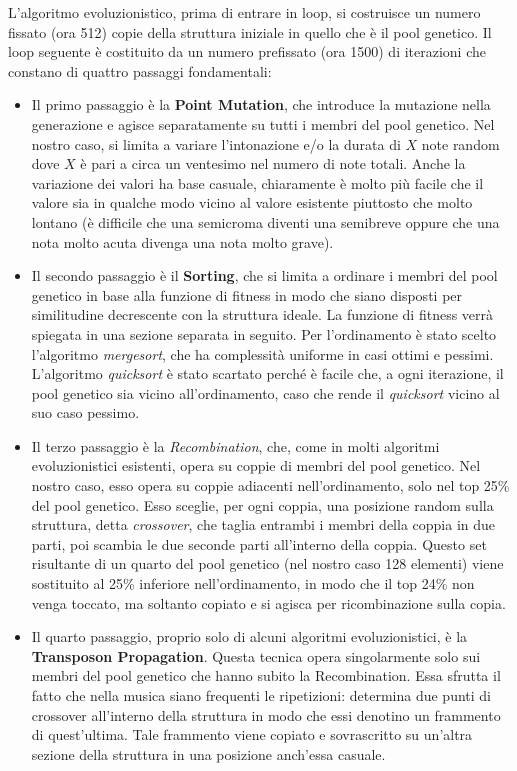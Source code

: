 L'algoritmo evoluzionistico, prima di entrare in loop, si costruisce un numero fissato (ora 512) copie della struttura iniziale in quello che è il pool genetico.
Il loop seguente è costituito da un numero prefissato (ora 1500) di iterazioni che constano di quattro passaggi fondamentali\cite{yt:evol}:
\begin{itemize}
 \item Il primo passaggio è la \textbf{Point Mutation}, che introduce la mutazione nella generazione e agisce separatamente su tutti i membri del pool genetico.
 Nel nostro caso, si limita a variare l'intonazione e/o la durata di $X$ note random dove $X$ è pari a circa un ventesimo nel numero di note totali.
 Anche la variazione dei valori ha base casuale, chiaramente è molto più facile che il valore sia in qualche modo vicino al valore esistente piuttosto che molto lontano (è difficile che una semicroma diventi una semibreve oppure che una nota molto acuta divenga una nota molto grave).
 \item Il secondo passaggio è il \textbf{Sorting}, che si limita a ordinare i membri del pool genetico in base alla funzione di fitness in modo che siano disposti per similitudine decrescente con la struttura ideale.
 La funzione di fitness verrà spiegata in una sezione separata in seguito.
 Per l'ordinamento è stato scelto l'algoritmo \emph{mergesort}, che ha complessità uniforme in casi ottimi e pessimi.
 L'algoritmo \emph{quicksort} è stato scartato perché è facile che, a ogni iterazione, il pool genetico sia vicino all'ordinamento, caso che rende il \emph{quicksort} vicino al suo caso pessimo.
 \item Il terzo passaggio è la \textit{Recombination}, che, come in molti algoritmi evoluzionistici esistenti, opera su coppie di membri del pool genetico.
 Nel nostro caso, esso opera su coppie adiacenti nell'ordinamento, solo nel top 25\% del pool genetico.
 Esso sceglie, per ogni coppia, una posizione random sulla struttura, detta \emph{crossover}, che taglia entrambi i membri della coppia in due parti, poi scambia le due seconde parti all'interno della coppia.
 Questo set risultante di un quarto del pool genetico (nel nostro caso 128 elementi) viene sostituito al 25\% inferiore nell'ordinamento, in modo che il top 24\% non venga toccato, ma soltanto copiato e si agisca per ricombinazione sulla copia.
 \item Il quarto passaggio, proprio solo di alcuni algoritmi evoluzionistici, è la \textbf{Transposon Propagation}.
 Questa tecnica opera singolarmente solo sui membri del pool genetico che hanno subito la Recombination.
 Essa sfrutta il fatto che nella musica siano frequenti le ripetizioni: determina due punti di crossover all'interno della struttura in modo che essi denotino un frammento di quest'ultima.
 Tale frammento viene copiato e sovrascritto su un'altra sezione della struttura in una posizione anch'essa casuale. 
 \end{itemize}

